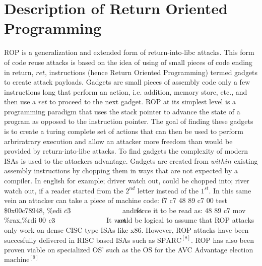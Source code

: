 \documentclass[11pt]{amsart}
\newcommand{\tab}[1]{\hspace{.2\textwidth}\rlap{#1}}
\begin{document}
\section*{Description of Return Oriented Programming}
ROP is a generalization and extended form of return-into-libc attacks. This form of code reuse attacks is based on the idea of using of small pieces of code ending in return, $ret$, instructions (hence Return Oriented Programming) termed gadgets to create attack payloads. Gadgets are small pieces of assembly code only a few instructions long that perform an action, i.e. addition, memory store, etc., and then use a $ret$ to proceed to the next gadget. ROP at its simplest level is a programming paradigm that uses the stack pointer to advance the state of a program as opposed to the instruction pointer. The goal of finding these gadgets is to create a turing complete set of actions that can then be used to perform arbriratrary execution and allow an attacker more freedom than would be provided by return-into-libc attacks. \newline \newline
To find gadgets the complexity of modern ISAs is used to the attackers advantage.  Gadgets are created from $within$ existing assembly instructions by chopping them in ways that are not expected by a compiler.  In english for example; driver watch out, could be chopped into; river watch out, if a reader started from the $2^{nd}$ letter instead of the $1^{st}$.  In this same vein an attacker can take a piece of machine code: \newline
\hspace*{10 mm} f7 c7 48 89 c7 00 \hspace*{10 mm} test \$0x00c78948, \%edi \newline
\hspace*{10 mm} $c3\tab{\hspace*{6 mm} ret}$ \newline 
and force it to be read as: \newline
\hspace*{10 mm} 48 89 c7 \hspace*{26 mm}mov \%rax,\%rdi \newline
\hspace*{10 mm} $00$ \newline
\hspace*{10 mm} $c3\tab{\hspace*{6 mm} ret}$  \newline \newline
It would be logical to assume that ROP attacks only work on dense CISC type ISAs like x86.  However, ROP attacks have been succesfully delivered in RISC based ISAs such as $\text{SPARC}^{[8]}$.  ROP has also been proven viable on specialized OS' such as the OS for the AVC Advantage election $\text{machine}^{[9]}$ \newline \newline
\end{document}
